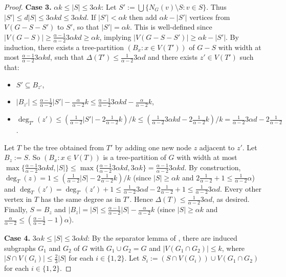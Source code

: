 \begin{proof}
\textbf{Case 3.} $\alpha k \leq |S|\leq 3 \alpha   k$: Let $S':=\bigcup\{ N_G(v)\setminus S: v\in S\}$. Thus $|S'|\leq d |S|\leq 3 \alpha   kd\leq 3 \alpha  kd$. If $|S'|< \alpha  k$ then add $\alpha k-|S'|$ vertices from $V(G-S-S')$ to $S'$, so that $|S'|=\alpha k$. This is well-defined since 
$|V(G-S)| \geq \frac{\alpha-1}{\alpha-2}  3 \alpha   kd \geq \alpha k$, implying $|V(G-S-S')| \geq \alpha k-|S'|$.
By induction, there exists a tree-partition $(B_x:x\in V(T'))$ of $G-S$ with width at most $\frac{\alpha-1}{\alpha-2}  3 \alpha    kd$, such that $\Delta(T')\leq \frac{1}{\alpha-2} 3 \alpha   d$ and there exists $z'\in V(T')$ such that:
\begin{itemize}
    \item $S'\subseteq B_{z'}$, 
    \item $|B_{z'}|\leq \frac{\alpha-1}{\alpha-2} |S'|- \frac{\alpha}{\alpha-2} k \leq \frac{\alpha-1}{\alpha-2} 3 \alpha  kd - \frac{\alpha}{\alpha-2} k$,
    \item $\deg_{T'}(z')\leq ( \frac{1}{\alpha-2} |S'| - 2 \frac{1}{\alpha-2}  k)/k \leq (\frac{1}{\alpha-2} 3 \alpha  kd-2 \frac{1}{\alpha-2} k)/k= \frac{1}{\alpha-2}3 \alpha  d-2 \frac{1}{\alpha-2} $.
\end{itemize}
Let $T$ be the tree obtained from $T'$ by adding one new node $z$ adjacent to $z'$. Let $B_z:=S$. So $(B_x:x\in V(T))$ is a tree-partition of $G$ with width at most $\max\{\frac{\alpha-1}{\alpha-2}  3 \alpha   kd,|S|\}\leq\max\{\frac{\alpha-1}{\alpha-2}  3 \alpha   kd,3 \alpha  k\}=\frac{\alpha-1}{\alpha-2}  3 \alpha   kd$. By construction, $\deg_T(z)=1 \leq ( \frac{1}{\alpha-2} |S| - 2 \frac{1}{\alpha-2}  k)/k$ (since $|S|\geq \alpha k$ and $2 \frac{1}{\alpha-2} +1 \leq \frac{1}{\alpha-2} \alpha   $) and $\deg_{T}(z') = \deg_{T'}(z')+1\leq \frac{1}{\alpha-2} 3 \alpha  d - 2 \frac{1}{\alpha-2}  + 1  \leq \frac{1}{\alpha-2} 3 \alpha   d$. Every other vertex in $T$ has the same degree as in $T'$. Hence $\Delta(T)\leq \frac{1}{\alpha-2} 3 \alpha   d$, as desired. Finally, $S=B_z$ and $|B_z|=|S| \leq \frac{\alpha-1}{\alpha-2}  |S|- \frac{\alpha}{\alpha-2} k$ (since $|S|\geq \alpha k$ and $ \frac{\alpha}{\alpha-2}  \leq (\frac{\alpha-1}{\alpha-2} -1) \alpha $).

\textbf{Case 4.} $3 \alpha   k \leq |S|\leq 3 \alpha  kd$: By the separator lemma of \citet[(2.6)]{RS-II}, there are induced subgraphs $G_1$ and $G_2$ of $G$ with $G_1\cup G_2=G$ and $|V(G_1\cap G_2)|\leq k$, where $|S\cap V(G_i)|\leq \frac23 |S|$ for each $i\in\{1,2\}$. Let $S_i := (S\cap V(G_i))\cup V(G_1\cap G_2)$ for each $i\in\{1,2\}$.


\end{proof}
